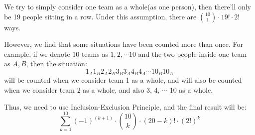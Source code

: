 \documentclass[a4paper,11pt]{article}
\begin{document}
\begin{spacing}{1.4}
    \hspace{2em}
    We try to simply consider one team as a whole(as one person), 
    then there'll only be 
    19 people sitting in a row. Under this assumption, there are
    ${10\choose 1}\cdot 19!\cdot 2!$ ways.

    \hspace{2em}
    However, we find that some situations have been counted more than once.
    For example, if we denote 10 teams as $1,2,\cdots 10$ and the two
    people inside one team as $A, B$, then the situation:
    $$1_A 1_B 2_A 2_B 3_B 3_A 4_B 4_A\cdots 10_B 10_A$$
    will be counted when we consider team 1 as a whole, and will also be 
    counted when we consider team 2 as a whole, and also 3, 4, $\cdots$ 10
    as a whole.

    \hspace{2em}
    Thus, we need to use Inclusion-Exclusion Principle, and the final result
    will be:
    $$\sum_{k=1}^{10}(-1)^{(k+1)}\cdot {10\choose k}\cdot (20-k)!\cdot (2!)^k$$
    

    

    
    \end{spacing}
\end{document}
